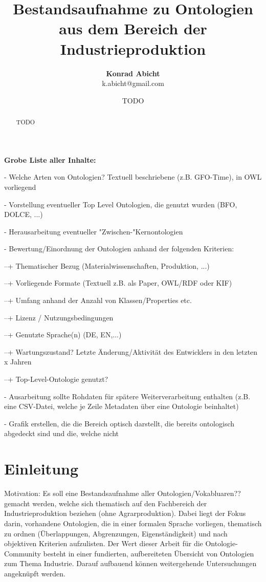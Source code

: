 \documentclass{article}
\title{Bestandsaufnahme zu Ontologien aus dem Bereich der Industrieproduktion}
\author{\textbf{Konrad Abicht} \\ k.abicht@gmail.com}
\date{TODO}
\begin{document}
\maketitle

\begin{abstract}
    TODO
\end{abstract}


\textbf{Grobe Liste aller Inhalte:}

- Welche Arten von Ontologien? Textuell beschriebene (z.B. GFO-Time), in OWL vorliegend

- Vorstellung eventueller Top Level Ontologien, die genutzt wurden (BFO, DOLCE, ...)

- Herausarbeitung eventueller "Zwischen-"Kernontologien

- Bewertung/Einordnung der Ontologien anhand der folgenden Kriterien:

--+ Thematischer Bezug (Materialwissenschaften, Produktion, ...)

--+ Vorliegende Formate (Textuell z.B. als Paper, OWL/RDF oder KIF)

--+ Umfang anhand der Anzahl von Klassen/Properties etc.

--+ Lizenz / Nutzungsbedingungen

--+ Genutzte Sprache(n) (DE, EN,...)

--+ Wartungszustand? Letzte Änderung/Aktivität des Entwicklers in den letzten x Jahren

--+ Top-Level-Ontologie genutzt?

- Ausarbeitung sollte Rohdaten für spätere Weiterverarbeitung enthalten (z.B. eine CSV-Datei, welche je Zeile Metadaten über eine Ontologie beinhaltet)

- Grafik erstellen, die die Bereich optisch darstellt, die bereits ontologisch abgedeckt sind und die, welche nicht



\section{Einleitung}

Motivation: Es soll eine Bestandsaufnahme aller Ontologien/Vokabluaren?? gemacht werden, welche sich thematisch auf den Fachbereich der Industrieproduktion beziehen (ohne Agrarproduktion). Dabei liegt der Fokus darin, vorhandene Ontologien, die in einer formalen Sprache vorliegen, thematisch zu ordnen (Überlappungen, Abgrenzungen, Eigenständigkeit) und nach objektiven Kriterien aufzulisten. Der Wert dieser Arbeit für die Ontologie-Community besteht in einer fundierten, aufbereiteten Übersicht von Ontologien zum Thema Industrie. Darauf aufbauend können weitergehende Untersuchungen angeknüpft werden.
\end{document}
